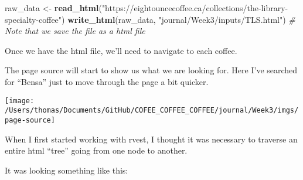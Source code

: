 \documentclass[]{article}
\newenvironment{Shaded}{\begin{snugshade}}{\end{snugshade}}
\newcommand{\CommentTok}[1]{\textcolor[rgb]{0.56,0.35,0.01}{\textit{#1}}}
\newcommand{\DataTypeTok}[1]{\textcolor[rgb]{0.13,0.29,0.53}{#1}}
\newcommand{\DecValTok}[1]{\textcolor[rgb]{0.00,0.00,0.81}{#1}}
\newcommand{\KeywordTok}[1]{\textcolor[rgb]{0.13,0.29,0.53}{\textbf{#1}}}
\newcommand{\NormalTok}[1]{#1}
\newcommand{\OperatorTok}[1]{\textcolor[rgb]{0.81,0.36,0.00}{\textbf{#1}}}
\newcommand{\StringTok}[1]{\textcolor[rgb]{0.31,0.60,0.02}{#1}}
\begin{document}
\begin{Shaded}
\begin{Highlighting}[]
\NormalTok{raw_data <-}\StringTok{ }\KeywordTok{read_html}\NormalTok{(}\StringTok{"https://eightouncecoffee.ca/collections/the-library-specialty-coffee"}\NormalTok{)}
\KeywordTok{write_html}\NormalTok{(raw_data, }\StringTok{"journal/Week3/inputs/TLS.html"}\NormalTok{) }\CommentTok{# Note that we save the file as a html file}
\end{Highlighting}
\end{Shaded}

Once we have the html file, we'll need to navigate to each coffee.

The page source will start to show us what we are looking for. Here I've
searched for ``Bensa'' just to move through the page a bit quicker.

\texttt{[image: /Users/thomas/Documents/GitHub/COFEE\_COFFEE\_COFFEE/journal/Week3/imgs/page-source]}

When I first started working with rvest, I thought it was necessary to
traverse an entire html ``tree'' going from one node to another.

It was looking something like this:

\begin{Shaded}
\end{Shaded}
\end{document}

